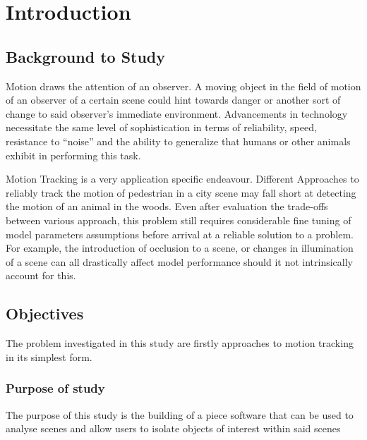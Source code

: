 \chapter{Introduction}

\section{Background to Study}
Motion draws the attention of an observer. A moving object in the field of
motion of an observer of a certain scene could hint towards danger or another
sort of change to said observer's immediate environment. Advancements in
technology necessitate the same level of sophistication in terms of
reliability, speed, resistance to ``noise'' and the ability to generalize that
humans or other animals exhibit in performing this task.

Motion Tracking is a very application specific endeavour. Different Approaches to
reliably track the motion of pedestrian in a city scene may fall short at
detecting the motion of an animal in the woods. Even after evaluation the
trade-offs between various approach, this problem still requires considerable fine
tuning of model parameters assumptions before arrival at a reliable solution
to a problem.  For example, the introduction of occlusion to a scene, or changes
in illumination of a scene can all drastically affect model performance should
it not intrinsically account for this.

\section{Objectives}\label{introduction_objectives}

The problem investigated in this study are firstly approaches to motion tracking
in its simplest form.

\subsection{Purpose of study}
The purpose of this study is the building of a piece software that can be used
to analyse scenes and allow users to isolate objects of interest within said
scenes

